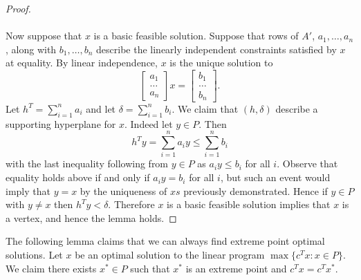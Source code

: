 \begin{proof}
\paragraph{}
Now suppose that $x$ is a basic feasible solution. Suppose that rows of $A'$, $a_1, \dots, a_n$, along with $b_1, \dots, b_n$ describe the linearly independent constraints satisfied by $x$ at equality. By linear independence, $x$ is the unique solution to 
$$\begin{bmatrix} a_1 \\ \dots \\ a_n \end{bmatrix} x = \begin{bmatrix} b_1 \\ \dots \\ b_n \end{bmatrix}.$$
Let $h^T = \sum_{i=1}^n a_i$ and let $\delta = \sum_{i=1}^n b_i$. We claim that $(h, \delta)$ describe a supporting hyperplane for $x$. Indeed let $y \in P$. Then 
$$ h^T y = \sum_{i=1}^n a_i y \leq \sum_{i=1}^n b_i$$
with the last inequality following from $y \in P$ as $a_i y \leq b_i$ for all $i$. Observe that equality holds above if and only if $a_i y = b_i$ for all $i$, but such an event would imply that $y = x$ by the uniqueness of $xs$ previously demonstrated. Hence if $y \in P$ with $y \neq x$ then $h^T y < \delta$. Therefore $x$ is a basic feasible solution implies that $x$ is a vertex, and hence the lemma holds. 
\end{proof}
\begin{lemma}The following lemma claims that we can always find extreme point optimal solutions. Let $x$ be an optimal solution to the linear program $\max\{c^Tx : x \in P \}$. We claim there exists $x^* \in P$ such that $x^*$ is an extreme point and $c^Tx = c^Tx^*$.
\end{lemma}
